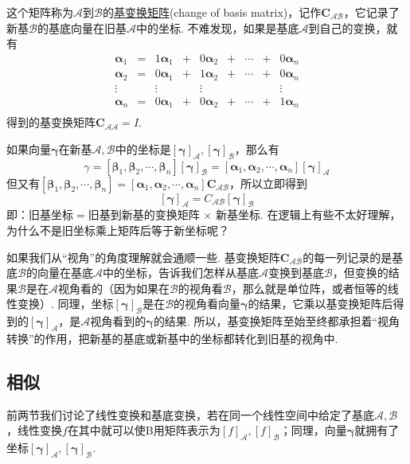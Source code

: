 \documentclass[main.tex]{subfiles}
\begin{document}
这个矩阵称为\(\mathcal{A}\)到\(\mathcal{B}\)的\uline{基变换矩阵}(change of basis matrix)，记作\(\bm C_\mathcal{AB}\)，它记录了新基\(\mathcal B\)的基底向量在旧基\(\mathcal{A}\)中的坐标. 不难发现，如果是基底\(\mathcal{A}\)到自己的变换，就有
\[
    \begin{array}{ccccccccc}
        \bm{\alpha}_1 &=& 1 \bm{\alpha}_1  & + & 0 \bm{\alpha}_2 & + & \cdots & + & 0 \bm{\alpha}_n \\
        \bm{\alpha}_2 &=& 0 \bm{\alpha}_1  & + & 1 \bm{\alpha}_2 & + & \cdots & + & 0 \bm{\alpha}_n \\
        \vdots & & \vdots & & \vdots & & & & \vdots\\
        \bm{\alpha}_n &=& 0 \bm{\alpha}_1  & + & 0 \bm{\alpha}_2 & + & \cdots & + & 1 \bm{\alpha}_n \\
    \end{array}
\]
得到的基变换矩阵\(\bm C_\mathcal{AA} = I\).

如果向量\(\bm\gamma\)在新基\(\mathcal A, \mathcal B\)中的坐标是\([\bm\gamma]_\mathcal{A}, [\bm\gamma]_\mathcal{B}\)，那么有
\[\gamma = [\bm{\beta}_1, \bm{\beta}_2, \cdots, \bm{\beta}_n] [\bm\gamma]_\mathcal{B} = [\bm{\alpha}_1, \bm{\alpha}_2,\cdots,\bm{\alpha}_n][\bm\gamma]_\mathcal{A}\]
但又有\([\bm{\beta}_1, \bm{\beta}_2, \cdots, \bm{\beta}_n] = [\bm{\alpha}_1, \bm{\alpha}_2,\cdots,\bm{\alpha}_n]\bm C_\mathcal{AB}\)，所以立即得到
\[[\bm\gamma]_\mathcal{A} = C_\mathcal{AB}[\bm\gamma]_\mathcal{B}\]
即：旧基坐标\(=\)旧基到新基的变换矩阵 \(\times\) 新基坐标. 在逻辑上有些不太好理解，为什么不是旧坐标乘上矩阵后等于新坐标呢？

如果我们从“视角”的角度理解就会通顺一些. 基变换矩阵\(\bm C_\mathcal{AB}\)的每一列记录的是基底\(\mathcal{B}\)的向量在基底\(\mathcal{A}\)中的坐标，告诉我们怎样从基底\(\mathcal{A}\)变换到基底\(\mathcal{B}\)，但变换的结果\(\mathcal{B}\)是在\(\mathcal{A}\)视角看的（因为如果在\(\mathcal{B}\)的视角看\(\mathcal{B}\)，那么就是单位阵，或者恒等的线性变换）. 同理，坐标\([\bm\gamma]_\mathcal{B}\)是在\(\mathcal{B}\)的视角看向量\(\bm\gamma\)的结果，它乘以基变换矩阵后得到的\([\bm\gamma]_\mathcal{A}\)，是\(\mathcal{A}\)视角看到的\(\bm\gamma\)的结果. 所以，基变换矩阵至始至终都承担着“视角转换”的作用，把新基的基底或新基中的坐标都转化到旧基的视角中.


\subsection{相似}

前两节我们讨论了线性变换和基底变换，若在同一个线性空间中给定了基底\(\mathcal{A},\mathcal{B}\)，线性变换\(f\)在其中就可以使B用矩阵表示为\([f]_\mathcal{A},[f]_\mathcal{B}\)；同理，向量\(\bm\gamma\)就拥有了坐标\([\bm\gamma]_\mathcal{A},[\bm\gamma]_\mathcal{B}\).
\end{document}
